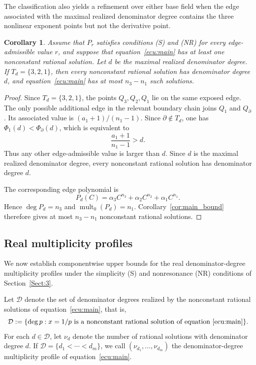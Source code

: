 \documentclass[12pt,a4paper]{amsart}
\numberwithin{theorem}{section}
\newtheorem{corollary}[theorem]{Corollary}
\theoremstyle{definition}
\begin{document}
	The classification also yields a refinement over either base field when the edge associated with the maximal realized denominator degree contains the three nonlinear exponent points but not the derivative point.
	
	\begin{corollary}\label{cor:three-nonlinear-edge}
		Assume that $P_r$ satisfies conditions {\rm (S)} and {\rm (NR)} for every edge-admissible value $r$, and suppose that equation~\eqref{ecu:main} has at least one nonconstant rational solution. Let $d$ be the maximal realized denominator degree. If $T_d=\{3,2,1\}$, then every nonconstant rational solution has denominator degree $d$, and equation~\eqref{ecu:main} has at most $n_3-n_1$ such solutions.
	\end{corollary}
	
	\begin{proof}
		Since $T_d=\{3,2,1\}$, the points $Q_3,Q_2,Q_1$ lie on the same exposed edge. The only possible additional edge in the relevant boundary chain joins $Q_1$ and $Q_\partial$. Its associated value is $(a_1+1)/(n_1-1)$. Since $\partial\notin T_d$, one has $\Phi_1(d)<\Phi_\partial(d)$, which is equivalent to
		\[
		\frac{a_1+1}{n_1-1}>d.
		\]
		Thus any other edge-admissible value is larger than $d$. Since $d$ is the maximal realized denominator degree, every nonconstant rational solution has denominator degree $d$.
		
		The corresponding edge polynomial is
		\[
		P_d(C)=\alpha_3C^{n_3}+\alpha_2C^{n_2}+\alpha_1C^{n_1}.
		\]
		Hence $\deg P_d=n_3$ and $\operatorname{mult}_0(P_d)=n_1$. Corollary~\ref{cor:main_bound} therefore gives at most $n_3-n_1$ nonconstant rational solutions.
	\end{proof}
	
	\subsection{Real multiplicity profiles}%
	
	We now establish componentwise upper bounds for the real denominator-degree multiplicity profiles under the simplicity {\rm (S)} and nonresonance {\rm (NR)} conditions of Section~\ref{Sect:3}.
	
	Let $\mathcal D$ denote the set of denominator degrees realized by the nonconstant rational solutions of equation~\eqref{ecu:main}, that is,
	\[
	\mathcal D:=\{\deg p:x=1/p\text{ is a nonconstant rational solution of equation~\eqref{ecu:main}}\}.
	\]
	For each $d\in\mathcal D$, let $\nu_d$ denote the number of rational solutions with denominator degree $d$. If $\mathcal D=\{d_1<\cdots<d_m\}$, we call $(\nu_{d_1},\ldots,\nu_{d_m})$ the denominator-degree multiplicity profile of equation~\eqref{ecu:main}.
	
\end{document}
